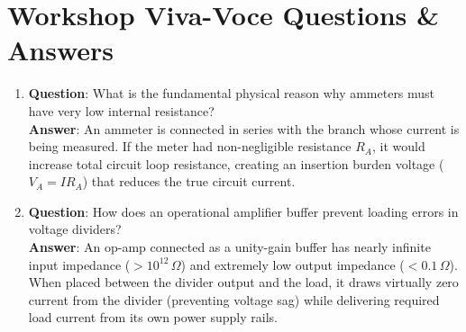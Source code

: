 \section{Workshop Viva-Voce Questions \& Answers}
\begin{enumerate}[leftmargin=1.5em]
    \item \textbf{Question}: What is the fundamental physical reason why ammeters must have very low internal resistance?\\
    \textbf{Answer}: An ammeter is connected in series with the branch whose current is being measured. If the meter had non-negligible resistance $R_A$, it would increase total circuit loop resistance, creating an insertion burden voltage ($V_A = I R_A$) that reduces the true circuit current.
    \item \textbf{Question}: How does an operational amplifier buffer prevent loading errors in voltage dividers?\\
    \textbf{Answer}: An op-amp connected as a unity-gain buffer has nearly infinite input impedance ($> 10^{12}\,\Omega$) and extremely low output impedance ($< 0.1\,\Omega$). When placed between the divider output and the load, it draws virtually zero current from the divider (preventing voltage sag) while delivering required load current from its own power supply rails.
\end{enumerate}
